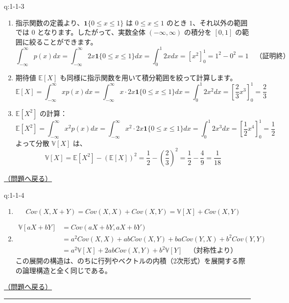 \begin{answerbox}[phantomlabel=a:1-1-3]{q:1-1-3}

\begin{enumerate}
\def\labelenumi{\arabic{enumi}.}
\tightlist
\item
  指示関数の定義より、\(\boldsymbol{1}\{0 \le x \le 1\}\) は
  \(0 \le x \le 1\) のとき \(1\)、それ以外の範囲では \(0\)
  となります。したがって、実数全体 \((-\infty, \infty)\) の積分を
  \([0, 1]\) の範囲に絞ることができます。 \[
       \int_{-\infty}^\infty p(x) dx = \int_{-\infty}^\infty 2x \boldsymbol{1}\{0 \le x \le 1\} dx = \int_0^1 2x dx = \left[ x^2 \right]_0^1 = 1^2 - 0^2 = 1 \quad \text{（証明終）}
       \]
\item
  期待値 \(\mathbb{E}[X]\)
  も同様に指示関数を用いて積分範囲を絞って計算します。 \[
       \mathbb{E}[X] = \int_{-\infty}^\infty x p(x) dx = \int_{-\infty}^\infty x \cdot 2x \boldsymbol{1}\{0 \le x \le 1\} dx = \int_0^1 2x^2 dx = \left[ \frac{2}{3}x^3 \right]_0^1 = \frac{2}{3}
       \]
\item
  \(\mathbb{E}[X^2]\) の計算： \[
       \mathbb{E}[X^2] = \int_{-\infty}^\infty x^2 p(x) dx = \int_{-\infty}^\infty x^2 \cdot 2x \boldsymbol{1}\{0 \le x \le 1\} dx = \int_0^1 2x^3 dx = \left[ \frac{1}{2}x^4 \right]_0^1 = \frac{1}{2}
       \] よって分散 \(\mathbb{V}[X]\) は、 \[
       \mathbb{V}[X] = \mathbb{E}[X^2] - (\mathbb{E}[X])^2 = \frac{1}{2} - \left(\frac{2}{3}\right)^2 = \frac{1}{2} - \frac{4}{9} = \frac{1}{18}
       \]
\end{enumerate}

\hfill 

\hyperref[q:1-1-3]{（問題へ戻る）}

\end{answerbox}

\begin{answerbox}[phantomlabel=a:1-1-4]{q:1-1-4}

\begin{enumerate}
\def\labelenumi{\arabic{enumi}.}
\tightlist
\item
  \[Cov(X, X+Y) = Cov(X,X) + Cov(X,Y) = \mathbb{V}[X] + Cov(X,Y)\]
\item
  \begin{align*}
       \mathbb{V}[aX+bY] &= Cov(aX+bY, aX+bY) \\
       &= a^2 Cov(X,X) + ab Cov(X,Y) + ba Cov(Y,X) + b^2 Cov(Y,Y) \\
       &= a^2 \mathbb{V}[X] + 2ab Cov(X,Y) + b^2 \mathbb{V}[Y] \quad \text{（対称性より）}
       \end{align*}
  この展開の構造は、のちに行列やベクトルの内積（2次形式）を展開する際の論理構造と全く同じである。
\end{enumerate}

\hfill 

\hyperref[q:1-1-4]{（問題へ戻る）}

\begin{center}\rule{0.5\linewidth}{0.5pt}\end{center}

\end{answerbox}

